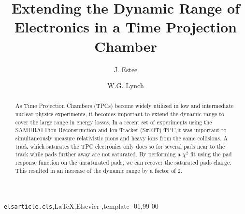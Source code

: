 \documentclass[review]{elsarticle}
\begin{document}
\begin{frontmatter}

\title{Extending the Dynamic Range of Electronics in a Time Projection Chamber}


\author[msu,nscl]{J. Estee}
\author[msu,nscl]{W.G. Lynch}

\address[msu]{Michigan State University, Dept. Physics and Astronomy }
\address[nscl]{National Superconducting Cyclotron Laboratory}

\begin{abstract}
As Time Projection Chambers (TPCs) become widely utilized in low and intermediate nuclear physics experiments,  it becomes important to extend the dynamic range to cover  the large range in energy losses. In a recent set of experiments using the SAMURAI Pion-Reconstruction and Ion-Tracker (S$\pi$RIT) TPC,it was important to simultaneously measure relativistic pions and heavy ions from the same collisions. A track which saturates the TPC electronics only does so for several pads near to the track while pads further away are not saturated. By performing a $\chi^2$ fit using the pad response function on the unsaturated pads, we can recover the saturated pads charge. This resulted in an increase of the dynamic range by a factor of 2. 
\end{abstract}

\begin{keyword}
\texttt{elsarticle.cls}\sep \LaTeX\sep Elsevier \sep template
-01\sep  99-00
\end{keyword}

\end{frontmatter}

\linenumbers
\end{document}
